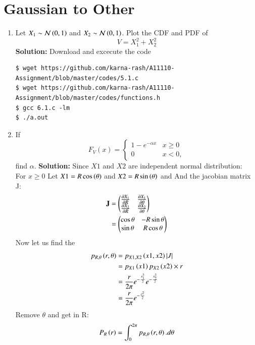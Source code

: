\documentclass[journal,12pt,twocolumn]{IEEEtran}
\renewcommand\thesection{\arabic{section}}
\begin{document}
\section{Gaussian to Other}
\begin{enumerate}[label=\thesection.\arabic*
,ref=\thesection.\theenumi]
\item
Let $X_1 \sim \mathcal{N}\left(0,1\right)$ and $X_2 \sim  \mathcal{N}\left(0,1\right)$. Plot the CDF and PDF of
%
\begin{equation}
V = X_1^2 + X_2^2
\end{equation}
%
%
%
\textbf{Solution:}
Download and excecute the code
	\begin{lstlisting}
$ wget https://github.com/karna-rash/A11110-Assignment/blob/master/codes/5.1.c
$ wget https://github.com/karna-rash/A11110-Assignment/blob/master/codes/functions.h
$ gcc 6.1.c -lm 
$ ./a.out 
	\end{lstlisting}
\item
If
%
\begin{equation}
F_{V}(x) = 
\begin{cases}
1 - e^{-\alpha x} & x \geq 0 \\
0 & x < 0,
\end{cases}
\end{equation}
%
find $\alpha$.
%
\textbf{Solution:}
Since $X1$ and $X2$ are independent normal distribution: \\
For $x \ge 0$
Let $X1=R\cos\left(\theta\right)$ and $X2=R\sin\left(\theta\right)$ and 
And the jacobian matrix J:
\begin{align}
\mathbf{J}&=\begin{pmatrix}\frac{\partial X_1}{\partial R}   & \frac{\partial X_1}{\partial \theta} \\
\frac{\partial X_2}{\partial R} & \frac{\partial X_2}{\partial \theta}\end{pmatrix} \\
&=\begin{pmatrix}\cos \theta  & -R\sin \theta \\ \sin \theta & R \cos \theta  \end{pmatrix}
\end{align}
Now let us find the 
\begin{align}
p_{R,\theta}\left(r,\theta\right)&=
p_{X1,X2}\left(x1,x2\right)\left\vert J\right\vert\\
&=p_{X1}\left(x1\right)p_{X2}\left(x2\right)\times r \\
&=\frac{r}{2\pi}e^{-\frac{x_1^2}{2}}e^{-\frac{x_2^2}{2}} \\
&=\frac{r}{2\pi}e^{-\frac{r^2}{2}}
\end{align}
Remove $\theta$ and get in R:
\begin{align}
P_R\brak{r}&=\int_{0}^{2\pi}p_{R,\theta}\brak{r,\theta}.d\theta \\

\end{align}
\end{enumerate}
\end{document}

